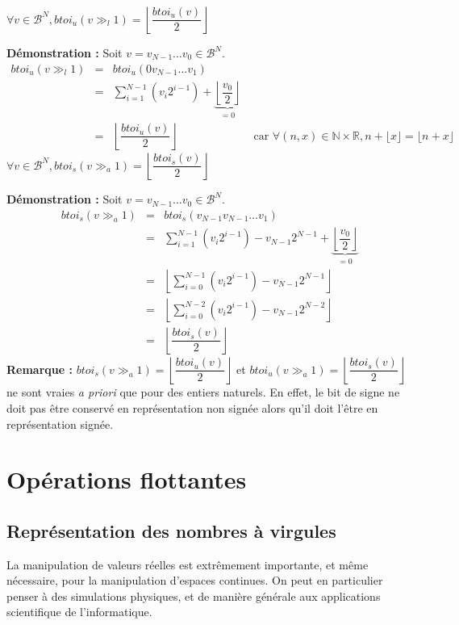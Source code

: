 \documentclass[../../main.tex]{subfiles}
\begin{document}
\proposition{} $\forall{v\in{\mathcal{B}^{N}}}, btoi_{u}(v\gg_{l}1) = \left\lfloor\dfrac{btoi_{u}(v)}{2}\right\rfloor$

\textbf{Démonstration :} Soit $v = v_{N-1}\dots v_{0}\in{\mathcal{B}^{N}}$.
\[
\begin{array}{lcll}
btoi_{u}(v\gg_{l}1)  & = & btoi_{u}(0v_{N-1}\dots v_{1}) \\
& = & \displaystyle\sum_{i = 1}^{N-1}(v_{i}2^{i-1}) + \underbrace{\left\lfloor\dfrac{v_{0}}{2}\right\rfloor}_{=0} \\
& = &  \left\lfloor\dfrac{btoi_{u}(v)}{2}\right\rfloor & \text{ car $\forall{(n, x)}\in{\mathbb{N}\times{\mathbb{R}}}, n + \lfloor{x}\rfloor = \lfloor{n + x}\rfloor$}
\end{array}
\]
\proposition{} $\forall{v\in{\mathcal{B}^{N}}}, btoi_{s}(v\gg_{a}1) = \left\lfloor\dfrac{btoi_{s}(v)}{2}\right\rfloor$

\textbf{Démonstration :} Soit $v = v_{N-1}\dots v_{0}\in{\mathcal{B}^{N}}$.
\[
\begin{array}{lcl}
btoi_{s}(v\gg_{a}1)  & = & btoi_{s}(v_{N-1}v_{N-1}\dots v_{1}) \\
& = & \displaystyle\sum_{i = 1}^{N-1}(v_{i}2^{i-1}) - v_{N-1}2^{N-1} + \underbrace{\left\lfloor\dfrac{v_{0}}{2}\right\rfloor}_{=0} \\
& = &  \left\lfloor{\displaystyle\sum_{i = 0}^{N-1}(v_{i}2^{i-1}) - v_{N-1}2^{N-1}}\right\rfloor \\
& = &  \left\lfloor{\displaystyle\sum_{i = 0}^{N-2}(v_{i}2^{i-1}) - v_{N-1}2^{N-2}}\right\rfloor \\
& = & \left\lfloor\dfrac{btoi_{s}(v)}{2}\right\rfloor
\end{array}
\]
\textbf{Remarque :} $btoi_{s}(v\gg_{a}1) = \left\lfloor\dfrac{btoi_{u}(v)}{2}\right\rfloor$ et $btoi_{u}(v\gg_{a}1) = \left\lfloor\dfrac{btoi_{s}(v)}{2}\right\rfloor$ ne sont vraies \textit{a priori} que pour des entiers naturels. En effet, le bit de signe ne doit pas être conservé en représentation non signée alors qu'il doit l'être en représentation signée.
\section{Opérations flottantes} \label{sec:op_rations_flottantes}
\subsection{Représentation des nombres à virgules}
\label{sub:repr_sentation_des_nombres_virgules}
La manipulation de valeurs réelles est extrêmement importante, et même nécessaire, pour la manipulation d'espaces continues. On peut en particulier penser à des simulations physiques, et de manière générale aux applications scientifique de l'informatique.
\end{document}
